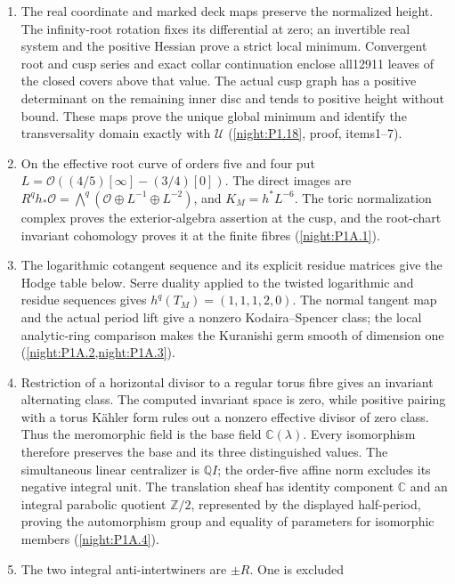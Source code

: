 \begin{enumerate}[label=\arabic*.]
\item The real coordinate and marked deck maps preserve the normalized
  height. The infinity-root rotation fixes its differential at zero;
  an invertible real system and the positive Hessian prove a strict
  local minimum. Convergent root and cusp series and exact collar
  continuation enclose all12911 leaves of the closed covers above
  that value. The actual cusp graph has a positive determinant on
  the remaining inner disc and tends to positive height without
  bound. These maps prove the unique global minimum and identify
  the transversality domain exactly with $\mathcal U$
  (\cref{night:P1.18}, proof, items1--7).
\item On the effective root curve of orders five and four put
  $L=\mathcal O((4/5)[\infty]-(3/4)[0])$.  The direct images are
  $R^qh_*\mathcal O=\bigwedge^q
  (\mathcal O\oplus L^{-1}\oplus L^{-2})$, and
  $K_M=h^*L^{-6}$.  The toric normalization complex proves the
  exterior-algebra assertion at the cusp, and the root-chart
  invariant cohomology proves it at the finite fibres
  (\cref{night:P1A.1}).
\item The logarithmic cotangent sequence and its explicit residue
  matrices give the Hodge table below.  Serre duality applied to
  the twisted logarithmic and residue sequences gives
  $h^q(T_M)=(1,1,1,2,0)$.  The normal tangent map and the actual
  period lift give a nonzero Kodaira--Spencer class; the local
  analytic-ring comparison makes the Kuranishi germ smooth of
  dimension one (\cref{night:P1A.2,night:P1A.3}).
\item Restriction of a horizontal divisor to a regular torus fibre
  gives an invariant alternating class.  The computed invariant
  space is zero, while positive pairing with a torus Kähler form
  rules out a nonzero effective divisor of zero class.  Thus the
  meromorphic field is the base field $\mathbb C(\lambda)$.
  Every isomorphism therefore preserves the base and its three
  distinguished values.  The simultaneous linear centralizer is
  $\mathbb Q I$; the order-five affine norm excludes its negative
  integral unit.  The translation sheaf has identity component
  $\mathbb C$ and an integral parabolic quotient $\mathbb Z/2$,
  represented by the displayed half-period, proving the
  automorphism group and equality of parameters for isomorphic
  members (\cref{night:P1A.4}).
\item The two integral anti-intertwiners are $\pm R$.  One is excluded

\end{enumerate}
